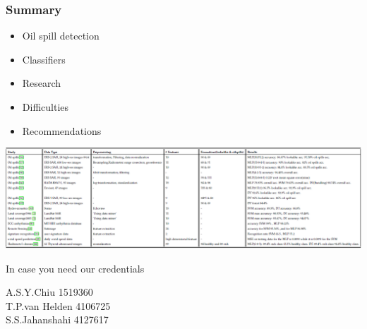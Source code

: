 \documentclass{beamer}
\begin{document}

\begin{frame}
\frametitle{Summary}
\begin{itemize}
	\item Oil spill detection
	\item Classifiers
	\item Research
	\item Difficulties
	\item Recommendations

\end{itemize}
\end{frame}


\begin{frame}

\end{frame}

\begin{frame}

\includegraphics[width=\textwidth]{./img/table.png}

\end{frame}

\begin{frame}
In case you need our credentials

A.S.Y.Chiu 1519360\\ T.P.van Helden 4106725\\ S.S.Jahanshahi 4127617


\end{frame}
\end{document}
